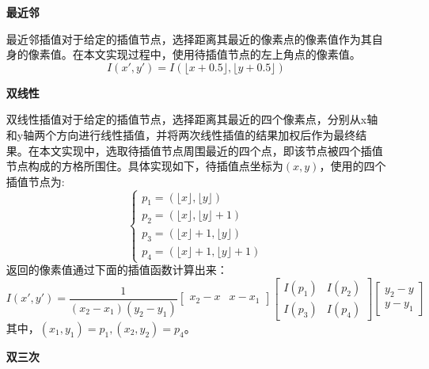 \documentclass[UTF8]{ctexart}
\begin{document}
\begin{itemize}
    \item [\textbf{最近邻}]

    最近邻插值对于给定的插值节点，选择距离其最近的像素点的像素值作为其自身的像素值。在本文实现过程中，使用待插值节点的左上角点的像素值。
    $$I(x',y')=I(\lfloor x+0.5 \rfloor,\lfloor y+0.5 \rfloor)$$
    \item [\textbf{双线性}]
    
    双线性插值对于给定的插值节点，选择距离其最近的四个像素点，分别从x轴和y轴两个方向进行线性插值，并将两次线性插值的结果加权后作为最终结果。在本文实现中，选取待插值节点周围最近的四个点，即该节点被四个插值节点构成的方格所围住。具体实现如下，$待插值点坐标为(x,y)$，使用的四个插值节点为:
    \begin{equation}
        \begin{cases}
            p_1 = (\lfloor x \rfloor , \lfloor y \rfloor)\\
            p_2 = (\lfloor x \rfloor, \lfloor y \rfloor +1)\\
            p_3 = (\lfloor x \rfloor +1, \lfloor y \rfloor)\\
            p_4 = (\lfloor x \rfloor +1, \lfloor y \rfloor +1)
        \end{cases}
    \end{equation}
    返回的像素值通过下面的插值函数计算出来：
$$
        I(x',y')=\frac{1}{(x_2-x_1)(y_2-y_1)}
        \left[
        \begin{matrix}
            x_2-x & x-x_1
        \end{matrix}    
        \right]
        \left[
        \begin{matrix}
            I(p_1) & I(p_2)\\
            I(p_3) & I(p_4)
        \end{matrix}    
        \right]
        \left[
        \begin{matrix}
            y_2-y\\
            y-y_1
        \end{matrix}    
        \right]
$$
    其中，$(x_1,y_1)=p_1, (x_2,y_2)=p_4$。

    \item [\textbf{双三次}]
    

\end{itemize}
\end{document}
